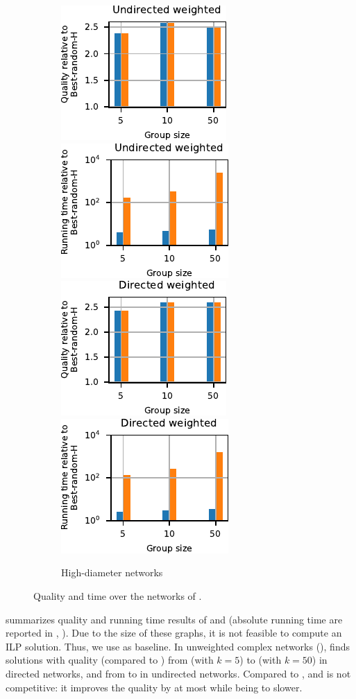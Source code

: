 \begin{figure}[tb]
\begin{subfigure}[t]{\textwidth}
\includegraphics[width=.24\textwidth]{./sources/plots/gh-gc-apx/quality-harmonic-high-diameter-undirected-weighted.pdf}
\includegraphics[width=.24\textwidth]{./sources/plots/gh-gc-apx/time-harmonic-high-diameter-undirected-weighted.pdf}
\includegraphics[width=.24\textwidth]{./sources/plots/gh-gc-apx/quality-harmonic-high-diameter-directed-weighted.pdf}
\includegraphics[width=.24\textwidth]{./sources/plots/gh-gc-apx/time-harmonic-high-diameter-directed-weighted.pdf}
\caption{High-diameter networks}
\label{fig:gh-gc-apx:qual-time-gh-high-diam}
\end{subfigure}\medskip
\caption{Quality and time \wrt \bestrandomh over the networks of .}
\label{fig:gh-gc-apx:qual-time-gh}
\end{figure}


 summarizes quality and running time results of \greedyh and
\greedylsh (absolute running time are reported in
,
).
Due to the size of these graphs, it is not feasible to compute an ILP solution.
Thus, we use \bestrandomh as baseline. In unweighted complex networks
(), \greedyh finds solutions with quality
(compared to \bestrandomh) from \minQualGRHRndCplxDir (with $k = 5$) to
\maxQualGRHRndCplxDir (with $k = 50$) in directed networks, and from
\minQualGRHRndCplxUnd to \maxQualGRHRndCplxUnd in undirected networks.
Compared to \greedyh, and \greedylsh is not competitive: it improves the
quality by at most \maxQualImprLSGRHCplxDir while being \minSlowdLSGRHCplxDir
to \maxSlowdLSGRHCplxDir slower.

